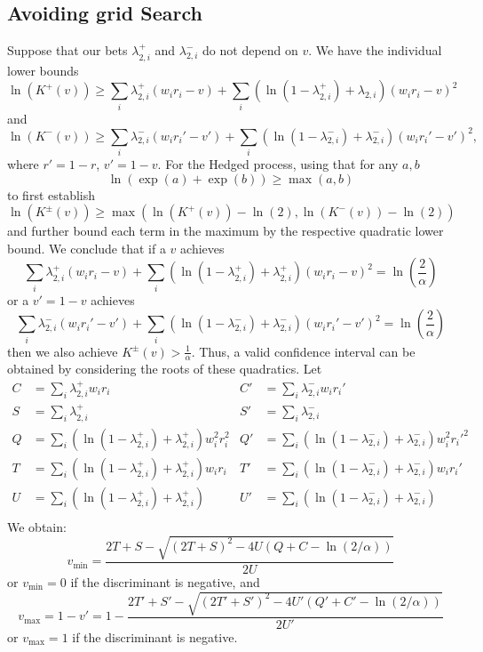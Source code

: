 \subsection{Avoiding grid Search}
\label{app:nogrid1d}
Suppose that our bets $\lambda_{2,i}^{+}$ and $\lambda_{2,i}^{-}$ 
do not depend on $v$.
We have the individual lower bounds
\[
\ln(K^{+}(v)) \geq \sum_i \lambda_{2,i}^{+} (w_i r_i -v) + \sum_i (\ln(1-\lambda_{2,i}^{+})+\lambda_{2,i})(w_i r_i -v)^2
\]
and
\[
\ln(K^{-}(v)) \geq \sum_i \lambda_{2,i}^{-} (w_i r_i' -v') + \sum_i (\ln(1-\lambda_{2,i}^{-})+\lambda_{2,i}^{-})(w_i r_i' -v')^2,
\]
where $r'=1-r$, $v'=1-v$.
For the Hedged process, using that for any $a,b$
\[
\ln\left(\exp(a)+\exp(b)\right)\geq \max(a,b)
\]
to first establish
\[
\ln(K^{\pm}(v)) \geq \max(\ln(K^{+}(v))-\ln(2),\ln(K^{-}(v))-\ln(2))
\]
and further bound each term in the maximum by the respective 
quadratic lower bound. We conclude that
if a $v$ achieves 
\[
\sum_i \lambda_{2,i}^{+} (w_i r_i -v) + \sum_i (\ln(1-\lambda_{2,i}^{+})+\lambda_{2,i}^{+})(w_i r_i -v)^2 = \ln\left(\frac{2}{\alpha}\right)
\]
or a $v'=1-v$ achieves 
\[
\sum_i \lambda_{2,i}^{-} (w_i r_i'-v') + \sum_i (\ln(1-\lambda_{2,i}^{-})+\lambda_{2,i}^{-})(w_i r_i' - v')^2
=\ln\left(\frac{2}{\alpha}\right)
\]
then we also achieve $K^{\pm}(v) > \frac{1}{\alpha}$. 
Thus, a valid confidence interval can be obtained by considering
the roots of these quadratics.  Let
\begin{align*}
C&=\sum_i \lambda_{2,i}^{+} w_i r_i & 
C'&=\sum_i \lambda_{2,i}^{-} w_i r_i'\\
S&=\sum_i \lambda_{2,i}^{+} & 
S'&=\sum_i \lambda_{2,i}^{-} \\
Q&=\sum_i \left(\ln(1-\lambda_{2,i}^{+})+\lambda_{2,i}^{+}\right) w_i^2 r_i^2 &
Q'&=\sum_i \left(\ln(1-\lambda_{2,i}^{-})+\lambda_{2,i}^{-}\right) w_i^2 r_i'^2\\
T&=\sum_i \left(\ln(1-\lambda_{2,i}^{+})+\lambda_{2,i}^{+}\right) w_ir_i &
T'&=\sum_i \left(\ln(1-\lambda_{2,i}^{-})+\lambda_{2,i}^{-}\right) w_ir_i'\\
U&=\sum_i \left(\ln(1-\lambda_{2,i}^{+})+\lambda_{2,i}^{+}\right) &
U'&=\sum_i \left(\ln(1-\lambda_{2,i}^{-})+\lambda_{2,i}^{-}\right)\\
\end{align*}
We obtain:
\[
v_{\min}= \frac{2T+S-\sqrt{(2T+S)^2-4U(Q+C-\ln(2/\alpha))}}{2U}
\]
or $v_{\min}=0$ if the discriminant is negative, 
and
\[
v_{\max}=1-v' = 1-\frac{2T'+S'-\sqrt{(2T'+S')^2-4U'(Q'+C'-\ln(2/\alpha))}}{2U'}
\]
or $v_{\max}=1$ if the discriminant is negative.

